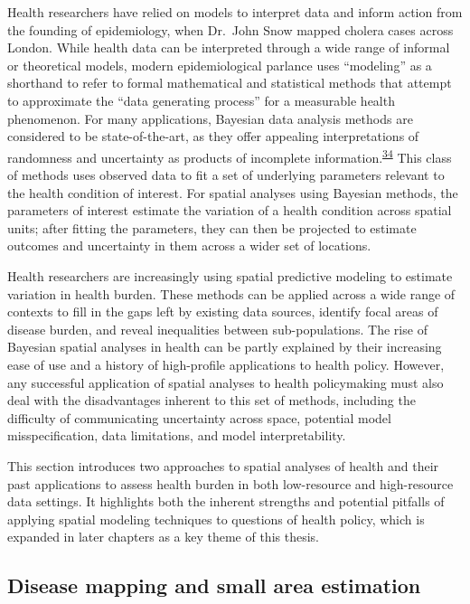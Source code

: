 \documentclass[
]{article}
\begin{document}
Health researchers have relied on models to interpret data and inform action from the founding of epidemiology, when Dr.~John Snow mapped cholera cases across London. While health data can be interpreted through a wide range of informal or theoretical models, modern epidemiological parlance uses ``modeling'' as a shorthand to refer to formal mathematical and statistical methods that attempt to approximate the ``data generating process'' for a measurable health phenomenon. For many applications, Bayesian data analysis methods are considered to be state-of-the-art, as they offer appealing interpretations of randomness and uncertainty as products of incomplete information.\textsuperscript{\protect\hyperlink{ref-McElreath2016}{34}} This class of methods uses observed data to fit a set of underlying parameters relevant to the health condition of interest. For spatial analyses using Bayesian methods, the parameters of interest estimate the variation of a health condition across spatial units; after fitting the parameters, they can then be projected to estimate outcomes and uncertainty in them across a wider set of locations.

Health researchers are increasingly using spatial predictive modeling to estimate variation in health burden. These methods can be applied across a wide range of contexts to fill in the gaps left by existing data sources, identify focal areas of disease burden, and reveal inequalities between sub-populations. The rise of Bayesian spatial analyses in health can be partly explained by their increasing ease of use and a history of high-profile applications to health policy. However, any successful application of spatial analyses to health policymaking must also deal with the disadvantages inherent to this set of methods, including the difficulty of communicating uncertainty across space, potential model misspecification, data limitations, and model interpretability.

This section introduces two approaches to spatial analyses of health and their past applications to assess health burden in both low-resource and high-resource data settings. It highlights both the inherent strengths and potential pitfalls of applying spatial modeling techniques to questions of health policy, which is expanded in later chapters as a key theme of this thesis.

\hypertarget{disease-mapping-and-small-area-estimation}{%
\subsection{Disease mapping and small area estimation}\label{disease-mapping-and-small-area-estimation}}
\end{document}
